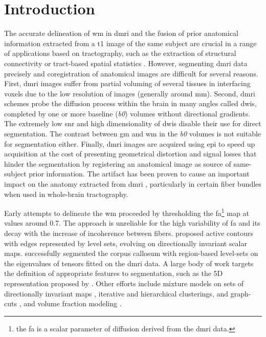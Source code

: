 \section{Introduction}\label{sec:introduction}
The accurate delineation of \gls*{wm} in \gls*{dmri} and the fusion of prior
  anatomical information extracted from a \gls*{t1} image of the same subject
  are crucial in a range of applications based on tractography, such as
  the extraction of structural connectivity \citep{craddock_imaging_2013} or
  tract-based spatial statistics \citep{smith_tractbased_2006}.
However, segmenting \gls*{dmri} data precisely and coregistration of anatomical
  images are difficult for several reasons.
First, \gls{dmri} images suffer from partial voluming of several tissues in 
  interfacing voxels due to the low resolution of images (generally around
  mm).
Second, \gls*{dmri} schemes probe the diffusion process within the brain in 
  many angles called \glspl*{dwi}, completed by one or more baseline (\emph{b0}) 
  volumes without directional gradients.
The extremely low \gls*{snr} and high dimensionality of \glspl*{dwi} disable their
  use for direct segmentation.
The contrast between \gls*{gm} and \gls*{wm} in the \emph{b0} volumes is not suitable for 
  segmentation either.
Finally, \gls*{dmri} images are acquired using \gls*{epi} to speed up acquisition
  at the cost of presenting geometrical distortion and 
  signal losses \citep{jezzard_correction_1995} that hinder the segmentation by
  registering an anatomical image as source of same-subject prior information.
The artifact has been proven to cause an important impact on the anatomy extracted
  from \gls*{dmri} \citep{irfanoglu_effects_2012}, particularly in certain fiber bundles
  when used in whole-brain tractography.

Early attempts to delineate the \gls*{wm} proceeded by thresholding the 
  \gls*{fa}\footnote{the \gls*{fa} is a scalar parameter of diffusion derived from
  the \gls*{dmri} data.} map at values around 0.7.
The approach is unreliable for the high variability of \gls*{fa} and its
  decay with the increase of incoherence between fibers.
\cite{zhukov_level_2003} proposed active contours with edges represented
  by level sets, evolving on directionally invariant scalar maps.
\cite{rousson_level_2004} successfully segmented the corpus callosum with
  region-based level-sets on the eigenvalues of tensors fitted on the
  \gls*{dmri} data.
A large body of work targets the definition of appropriate features to segmentation,
  such as the 5D representation proposed by \cite{jonasson_segmentation_2005}.
Other efforts include mixture models on sets of directionally invariant maps
  \citep{liu_brain_2007}, iterative \citep{hadjiprocopis_unbiased_2005} and
  hierarchical \citep{lu_segmentation_2008} clusterings,
  and graph-cuts \citep{han_experimental_2009},
  and volume fraction modeling \citep{kumazawa_improvement_2013}.
 
